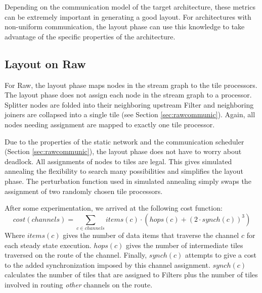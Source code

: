 Depending on the communication model of the target architecture, these
metrics can be extremely important in generating a good layout.  For
architectures with non-uniform communication, the layout phase can use
this knowledge to take advantage of the specific properties of the
architecture.  


\subsection{Layout on Raw}

For Raw, the layout phase maps nodes in the stream
graph to the tile processors.
The layout phase does not assign each node in the
stream graph to a processor.  Splitter nodes are folded into their
neighboring upstream Filter and neighboring joiners are collapsed
into a single tile (see Section \ref{sec:rawcommunic}).  
Again, all nodes needing assignment are mapped to
exactly one tile processor.

Due to the properties of the static network and the communication
scheduler (Section \ref{sec:rawcommunic}), the layout phase does not have to worry
about deadlock.  All assignments of nodes to tiles are legal.  This
gives simulated annealing the flexibility to search many possibilities
and simplifies the layout phase.  The perturbation function used in
simulated annealing simply swaps the assignment of two randomly chosen
tile processors.

After some experimentation, we arrived at
the following cost function: 
\[
cost(channels) = \sum _{c \in channels} items(c) \cdot \left( hops(c) + \left( 2 \cdot
synch(c) \right) ^{3} \right)
\]
Where \(items(c)\) gives the number of data items that traverse the
channel \(c\) for each steady state execution.  \(hops(c)\) gives the
number of intermediate tiles traversed on the route of the channel.
Finally, \(synch(c)\) attempts to give a cost to the added
synchronization imposed by this channel assignment.  \(synch(c)\)
calculates the number of tiles that are assigned to Filters plus the
number of tiles involved in routing \emph{other} channels on the route.

